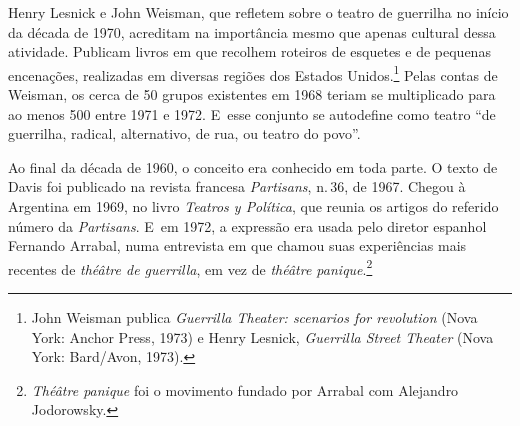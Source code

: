 
Henry Lesnick e John Weisman, que refletem sobre o teatro de guerrilha
no início da década de 1970, acreditam na importância mesmo que
apenas cultural dessa atividade. Publicam livros em que recolhem
roteiros de esquetes e de pequenas encenações, realizadas em diversas
regiões dos Estados Unidos.\footnote{John Weisman publica {\it Guerrilla
  Theater: scenarios for revolution} (Nova York: Anchor Press, 1973) e
  Henry Lesnick, {\it Guerrilla Street Theater} (Nova York: Bard/Avon,
  1973).} Pelas contas de Weisman, os cerca de 50 grupos existentes em
1968 teriam se multiplicado para ao menos 500 entre 1971 e 1972. E~esse
conjunto se autodefine como teatro “de guerrilha, radical, alternativo,
de rua, ou teatro do povo”.

Ao final da década de 1960, o conceito era conhecido em toda parte. O
texto de Davis foi publicado na revista francesa {\it Partisans}, n.\,36,
de 1967. Chegou à Argentina em 1969, no livro {\it Teatros y Política},
que reunia os artigos do referido número da {\it Partisans}. E~em 1972,
a expressão era usada pelo diretor espanhol Fernando Arrabal, numa
entrevista em que chamou suas experiências mais recentes de {\it théâtre
de guerrilla}, em vez de {\it théâtre panique}.\footnote{{\it Théâtre
  panique} foi o movimento fundado por Arrabal com Alejandro Jodorowsky.}

